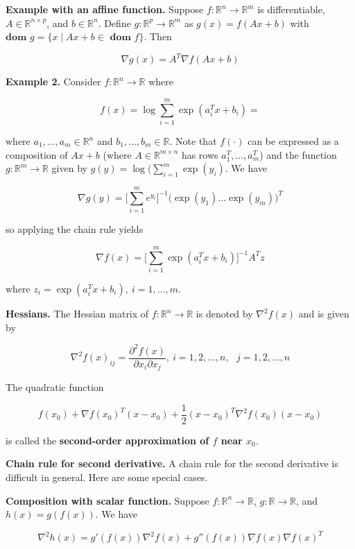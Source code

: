 \textbf{Example with an affine function.} Suppose \(f: \mathbb{R}^n \to \mathbb{R}^m\) is differentiable, \(A \in \mathbb{R}^{n \times p}\), and \(b \in \mathbb{R}^n\). Define \(g: \mathbb{R}^p \to \mathbb{R}^m\) as \(g(x) = f(Ax + b)\) with \(\textbf{dom } g = \{x \mid Ax + b \in \textbf{ dom } f \}\). Then 

\[
\nabla g(x) = A^T \nabla f(Ax + b)
\]

\textbf{Example 2.} Consider \(f: \mathbb{R}^n \to \mathbb{R}\) where 

\[
f(x) = \log \sum_{i=1}^m \exp(a_i^Tx + b_i) = 
\]

where \(a_1, \ldots, a_m \in \mathbb{R}^n\)  and \(b_1, \ldots, b_m \in \mathbb{R}\). Note that \(f(\cdot)\) can be expressed as a composition of \(Ax + b\) (where \(A \in \mathbb{R}^{m \times n}\) has rows \(a_1^T , \ldots, a_m^T\)) and the function \(g: \mathbb{R}^m \to \mathbb{R}\) given by \(g(y) = \log( \sum_{i=1}^m \exp(y_i)\). We have

\[
\nabla g(y) = \bigg[ \sum_{i=1}^m e^{y_i} \bigg]^{-1} \big( \exp(y_1) \ldots \exp(y_m) \big) ^T
\]

so applying the chain rule yields

\[
\nabla f(x) =  \bigg[ \sum_{i=1}^m \exp( a_i^T x + b_i) \bigg]^{-1} A^T z
\]

where \(z_i = \exp(a_i^T x + b_i), \ i =1 , \ldots, m\).

\textbf{Hessians.} The Hessian matrix of \(f: \mathbb{R}^n \to \mathbb{R}\) is denoted by \(\nabla^2f(x)\) and is given by

\[
\nabla^2 f(x)_{ij} = \frac{\partial^2 f(x)}{\partial x_i \partial x_j} , \ i = 1, 2, \ldots, n, \ \ \ j = 1, 2, \ldots, n
\]

The quadratic function

\[
f(x_0) + \nabla f(x_0)^T (x - x_0) + \frac{1}{2} (x - x_0)^T \nabla^2 f(x_0) (x - x_0)
\]

is called the \textbf{second-order approximation of \(f\) near \(x_0\)}.

\textbf{Chain rule for second derivative.} A chain rule for the second derivative is difficult in general. Here are some special cases.

\textbf{Composition with scalar function.} Suppose \(f: \mathbb{R}^n \to \mathbb{R}\), \(g: \mathbb{R} \to \mathbb{R}\), and \(h(x) = g(f(x))\). We have

\[
\nabla^2 h(x) = g'(f(x)) \nabla^2 f(x) + g''(f(x)) \nabla f(x) \nabla f(x)^T
\]

